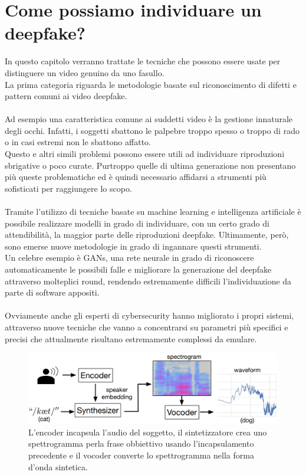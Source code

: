 \documentclass[12pt, a4paper]{article}
\begin{document}
\section{Come possiamo individuare un deepfake?}
In questo capitolo verranno trattate le tecniche che possono essere usate per distinguere un video genuino da uno fasullo.\\ La prima categoria riguarda le metodologie basate sul riconoscimento di difetti e pattern comuni ai video deepfake.\\\\
Ad esempio una caratteristica comune ai suddetti video è la gestione innaturale degli occhi. Infatti, i soggetti sbattono le palpebre troppo spesso o troppo di rado o in casi estremi non le sbattono affatto.\\
Questo e altri simili problemi possono essere utili ad individuare riproduzioni sbrigative o poco curate. Purtroppo quelle di ultima generazione non presentano più queste problematiche ed è quindi necessario affidarsi a strumenti più sofisticati per raggiungere lo scopo.\\\\
Tramite l'utilizzo di tecniche basate su machine learning e intelligenza artificiale è possibile realizzare modelli in grado di individuare, con un certo grado di attendibilità, la maggior parte delle riproduzioni deepfake. Ultimamente, però, sono emerse nuove metodologie in grado di ingannare questi strumenti.\\
Un celebre esempio è GANs, una rete neurale in grado di riconoscere automaticamente le possibili falle e migliorare la generazione del deepfake attraverso molteplici round, rendendo estremamente difficili l'individuazione da parte di software appositi.\\\\
Ovviamente anche gli esperti di cybersecurity hanno migliorato i propri sistemi, attraverso nuove tecniche che vanno a concentrarsi su parametri più specifici e precisi che attualmente risultano estremamente complessi da emulare.\\
\begin{figure}
\includegraphics[width=1\linewidth]{waveform.png}
\caption{L'encoder incapsula l'audio del soggetto, il sintetizzatore crea uno spettrogramma perla frase obbiettivo usando l'incapsulamento precedente e il vocoder converte lo spettrogramma nella forma d'onda sintetica.}
\label{fig2:wrapfig}
\end{figure}
\end{document}
